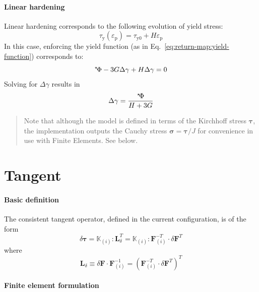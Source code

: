\documentclass{goose-article}
\newcommand\ST[1]{\hspace*{-.3em}~^\star\!#1}
\newcommand\T[1]{\bm{{#1}}}
\newcommand\TT[1]{\mathbb{{#1}}}
\begin{document}
\paragraph{Linear hardening}

Linear hardening corresponds to the following evolution of yield stress:
\begin{equation}
  \tau_\mathrm{y} ( \varepsilon_\mathrm{p} ) = \tau_\mathrm{y0} + H \varepsilon_\mathrm{p}
\end{equation}
In this case, enforcing the yield function (as in Eq.~\eqref{eq:return-map:yield-function}) corresponds to:
\begin{equation}
  \ST{\Phi} - 3 G \Delta \gamma + H \Delta \gamma = 0
\end{equation}
Solving for $\Delta \gamma$ results in
\begin{equation}
  \Delta \gamma = \frac{\ST{\Phi}}{H + 3G}
\end{equation}

\begin{framed}
\begin{quote}
  Note that although the model is defined in terms of the Kirchhoff stress $\T{\tau}$, the implementation outputs the Cauchy stress $\T{\sigma} = \T{\tau} / J$ for convenience in use with Finite Elements. See below.
\end{quote}
\end{framed}

\section{Tangent}

\paragraph{Basic definition}

The consistent tangent operator, defined in the current configuration, is of the form
%
\begin{equation}
  \delta \bm{\tau}
  =
  \TT{K}_{(i)}
  : \T{L}_\delta^T
  =
  \TT{K}_{(i)}
  : \T{F}_{(i)}^{-T} \cdot \delta \T{F}^T
  \label{eq:tangent}
\end{equation}
where
\begin{equation}
  \bm{L}_\delta
  \equiv \delta \bm{F} \cdot \bm{F}_{(i)}^{-1}
  = \left( \bm{F}_{(i)}^{-T} \cdot \delta \bm{F}^T \right)^T
\end{equation}

\paragraph{Finite element formulation}
\end{document}
